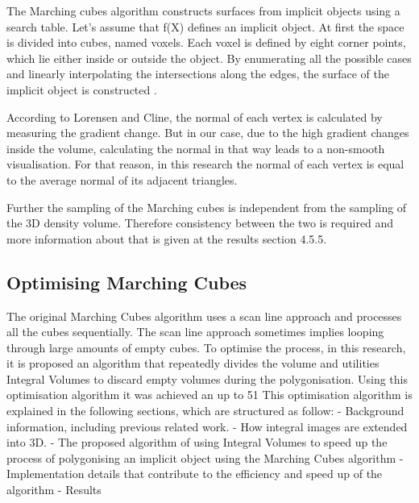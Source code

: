 \documentclass{subfiles}
\begin{document}
The Marching cubes algorithm constructs surfaces from implicit objects using a search table. Let’s assume that f(X) defines an implicit object. At first the space is divided into cubes, named voxels. Each voxel is defined by eight corner points, which lie either inside or outside the object. By enumerating all the possible cases and linearly interpolating the intersections along the edges, the surface of the implicit object is constructed \cite{Lorensen1987}.\newline\newline

According to Lorensen and Cline, the normal of each vertex is calculated by measuring the gradient change. But in our case, due to the high gradient changes inside the volume, calculating the normal in that way leads to a non-smooth visualisation. For that reason, in this research the normal of each vertex is equal to the average normal of its adjacent triangles. \newline\newline

Further the sampling of the Marching cubes is independent from the sampling of the 3D density volume. Therefore consistency between the two is required and more information about that is given at the results section 4.5.5. 

\subsection{Optimising Marching Cubes}
The original Marching Cubes algorithm uses a scan line approach and processes all the cubes sequentially. The scan line approach sometimes implies looping through large amounts of empty cubes. To optimise the process, in this research, it is proposed an algorithm that repeatedly divides the volume and utilities Integral Volumes to discard empty volumes during the polygonisation. Using this optimisation algorithm it was achieved an up to 51%
This optimisation algorithm is explained in the following sections, which are structured as follow:
-	Background information, including previous related work. 
-	How integral images are extended into 3D. 
-	The proposed algorithm of using Integral Volumes to speed up the process of polygonising an implicit object using the Marching Cubes algorithm
-	Implementation details that contribute to the efficiency and speed up of the algorithm
-	Results
\end{document}

